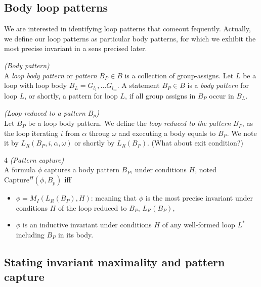 \documentclass[a4paper,10pt]{article}
\newcommand{\idx}{\ensuremath{i}\xspace}
\newcommand{\idxinitial}{\ensuremath{\alpha}\xspace}
\newcommand{\idxfinal}{\ensuremath{\omega}\xspace}
\newcommand{\SB}{\ensuremath{\mathit{B}}}
\newenvironment{definition}[1][Definition]{\begin{trivlist}
\item[\hskip \labelsep {\bfseries #1}]}{\end{trivlist}}
\begin{document}
\subsection{Body loop patterns}

We are interested in identifying  loop patterns that comeout  fequently. 
Actually, we define our loop patterns as particular body patterns, 
for which we exhibit the most precise invariant in a sens precised later.

\begin{definition} \emph{(Body pattern)}\\
A \textit{loop body pattern} or \textit{pattern} $B_P \in \SB$ is a collection of group-assigns.
Let $L$ be a loop with loop body $B_L = G_{l_1}, \ldots G_{l_m}$. 
A statement $B_P \in \SB$ is a \textit{body pattern} for loop $L$, or shortly, 
a pattern for loop $L$, if all group assigns in $B_P$ occur in $B_L$.
\end{definition}

\begin{definition} \emph{(Loop reduced to a pattern $B_p$)}\\
Let $B_P$ be a loop body pattern. We define the \textit{loop reduced to the pattern} $B_P$, 
as the loop  iterating \idx from $\idxinitial$ throug $\idxfinal$ and executing a body equals to $B_P$.
We note it by $L_R(B_P, i, \idxinitial,\idxfinal)$ or shortly by $L_R(B_P)$. (What about exit condition?)
\end{definition}


\begin{definition} 4 \emph {(Pattern capture)}\\
A formula $\phi$ captures a body pattern $B_P$, under conditions $H$,
noted $\mathrm{Capture}^H(\phi, B_p)$ \textbf{iff}
\begin{itemize}
\item[i.]  $\phi = M_I(L_R(B_P),H)$: meaning that $\phi$ is the most precise invariant 
           under conditions $H$ of the loop reduced to $B_P$, $L_R(B_P)$, 
\item[ii.] $\phi$ is an inductive invariant under conditions $H$ of any well-formed loop $L^*$ 
           including $B_P$ in its body.
\end{itemize}
\end{definition}

\subsection{Stating invariant maximality and pattern capture}
\end{document}
